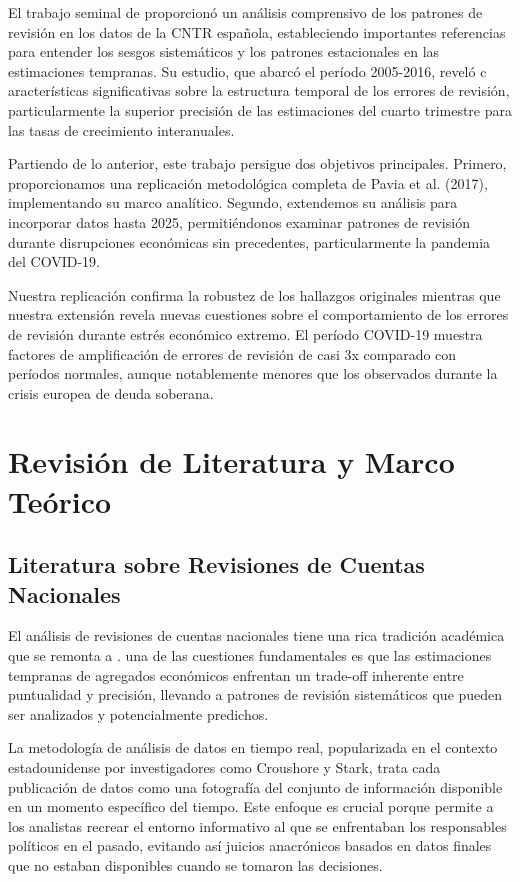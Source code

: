 \documentclass{article}
\begin{document}
El trabajo seminal de \citet{pavia2017} proporcionó un análisis comprensivo de los patrones de revisión en los datos de la CNTR española, estableciendo importantes referencias para entender los sesgos sistemáticos y los patrones estacionales en las estimaciones tempranas. Su estudio, que abarcó el período 2005-2016, reveló c aracterísticas significativas sobre la estructura temporal de los errores de revisión, particularmente la superior precisión de las estimaciones del cuarto trimestre para las tasas de crecimiento interanuales.

Partiendo de lo anterior, este trabajo persigue dos objetivos principales. Primero, proporcionamos una replicación metodológica completa de Pavia et al. (2017), implementando su marco analítico. Segundo, extendemos su análisis para incorporar datos hasta 2025, permitiéndonos examinar patrones de revisión durante disrupciones económicas sin precedentes, particularmente la pandemia del COVID-19.

Nuestra replicación confirma la robustez de los hallazgos originales mientras que nuestra extensión revela nuevas cuestiones sobre el comportamiento de los errores de revisión durante estrés económico extremo. El período COVID-19 muestra factores de amplificación de errores de revisión de casi 3x comparado con períodos normales, aunque notablemente menores que los observados durante la crisis europea de deuda soberana.

\section{Revisión de Literatura y Marco Teórico}

\subsection{Literatura sobre Revisiones de Cuentas Nacionales}

El análisis de revisiones de cuentas nacionales tiene una rica tradición académica que se remonta a \citet{young1993}. una de las cuestiones fundamentales es que las estimaciones tempranas de agregados económicos enfrentan un trade-off inherente entre puntualidad y precisión, llevando a patrones de revisión sistemáticos que pueden ser analizados y potencialmente predichos.

La metodología de análisis de datos en tiempo real, popularizada en el contexto estadounidense por investigadores como Croushore y Stark, trata cada publicación de datos como una fotografía del conjunto de información disponible en un momento específico del tiempo. Este enfoque es crucial porque permite a los analistas recrear el entorno informativo al que se enfrentaban los responsables políticos en el pasado, evitando así juicios anacrónicos basados en datos finales que no estaban disponibles cuando se tomaron las decisiones.
\end{document}

